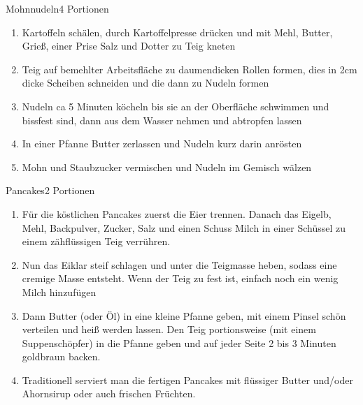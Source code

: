 \documentclass{article}
\begin{document}
\begin{recipe}{Mohnnudeln}{4 Portionen}{}


\begin{enumerate}
\item Kartoffeln schälen, durch Kartoffelpresse drücken und mit Mehl, Butter, Grieß, einer Prise Salz und Dotter zu Teig kneten
\item Teig auf bemehlter Arbeitsfläche zu daumendicken Rollen formen, dies in 2cm dicke Scheiben schneiden und die dann zu Nudeln formen
\item Nudeln ca 5 Minuten köcheln bis sie an der Oberfläche schwimmen und bissfest sind, dann aus dem Wasser nehmen und abtropfen lassen
\item In einer Pfanne Butter zerlassen und Nudeln kurz darin anrösten
\item Mohn und Staubzucker vermischen und Nudeln im Gemisch wälzen 
\end{enumerate}
\end{recipe}

\begin{recipe}{Pancakes}{2 Portionen}{}


\begin{enumerate}
\item Für die köstlichen Pancakes zuerst die Eier trennen. Danach das Eigelb, Mehl, Backpulver, Zucker, Salz und einen Schuss Milch in einer Schüssel zu einem zähflüssigen Teig verrühren.
\item Nun das Eiklar steif schlagen und unter die Teigmasse heben, sodass eine cremige Masse entsteht. Wenn der Teig zu fest ist, einfach noch ein wenig Milch hinzufügen
\item Dann Butter (oder Öl) in eine kleine Pfanne geben, mit einem Pinsel schön verteilen und heiß werden lassen. Den Teig portionsweise (mit einem Suppenschöpfer) in die Pfanne geben und auf jeder Seite 2 bis 3 Minuten goldbraun backen.
\item Traditionell serviert man die fertigen Pancakes mit flüssiger Butter und/oder Ahornsirup oder auch frischen Früchten.
\end{enumerate}
\end{recipe}
\end{document}
